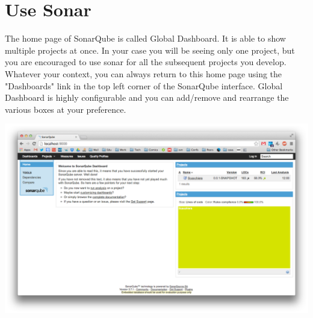 \documentclass{article}
\newif\ifinstall
\begin{document}
\ifinstall
\else

\section{Use Sonar}

The home page of SonarQube is called Global Dashboard. It is able to
show multiple projects at once. In your case you will be seeing only
one project, but you are encouraged to use sonar for all the
subsequent projects you develop. Whatever your context, you can
always return to this home page using the "Dashboards" link in the top
left corner of the SonarQube interface. Global Dashboard is highly
configurable and you can add/remove and rearrange the various boxes at
your preference. 
\begin{center}
\includegraphics[scale=0.3]{figures/ss1.png}
\end{center}

\end{document}
